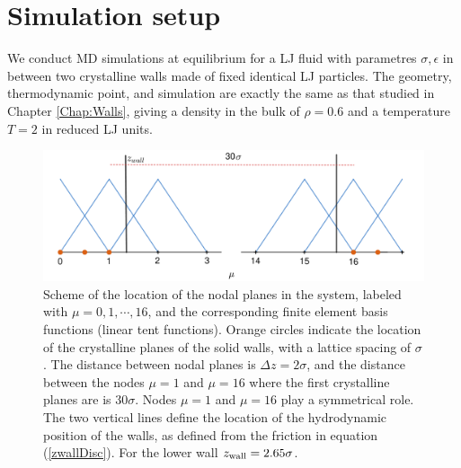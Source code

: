 \documentclass[b5paper,openright,10pt]{book}
\begin{document}
\section{Simulation setup}
\label{Sec:sim}
We  conduct  MD  simulations  at  equilibrium  for  a  LJ  fluid  with
parametres $\sigma,\epsilon$ in between  two crystalline walls made of
fixed identical LJ particles.   The geometry, thermodynamic point, and
simulation  are   exactly  the  same   as  that  studied   in  Chapter
\ref{Chap:Walls}, giving  a density in the  bulk of $\rho=0.6 $  and a
temperature $T=2$ in reduced LJ units.
\begin{figure}[]
  \centering
  \includegraphics[scale=0.2]{schemeNodes-4}
  \caption[Scheme of the location of the nodal planes in the system]{Scheme of the location of the nodal planes in the system, labeled
  with $\mu=0,1,\cdots,16$, and the corresponding finite element basis
  functions  (linear  tent  functions).    Orange  circles  indicate  the
  location  of the  crystalline  planes  of the  solid  walls, with  a
  lattice spacing  of $\sigma$. The  distance between nodal  planes is
  $\Delta z = 2\sigma$, and the distance between the nodes $\mu=1$ and
  $\mu=16$  where  the first  crystalline  planes  are is  $30\sigma$.
  Nodes  $\mu=1$  and  $\mu=16$  play a  symmetrical  role.   The  two
  vertical lines define  the location of the  hydrodynamic position of
  the walls, as  defined from the friction  in equation  (\ref{zwallDisc}).
  For the lower wall $z_{\rm wall}=2.65\sigma$. }
\label{Fig.Nodes}
\end{figure}
\end{document}
